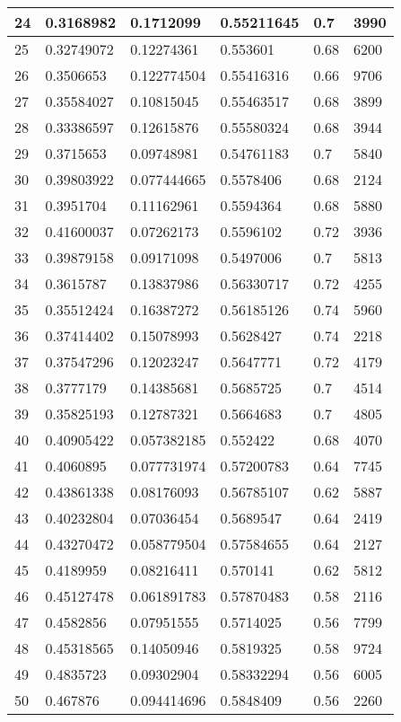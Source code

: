 \begin{longtable}{|l|l|l|l|l|l|}
24 & 0.3168982 & 0.1712099 & 0.55211645 & 0.7 & 3990 \\ \hline 
25 & 0.32749072 & 0.12274361 & 0.553601 & 0.68 & 6200 \\ \hline 
26 & 0.3506653 & 0.122774504 & 0.55416316 & 0.66 & 9706 \\ \hline 
27 & 0.35584027 & 0.10815045 & 0.55463517 & 0.68 & 3899 \\ \hline 
28 & 0.33386597 & 0.12615876 & 0.55580324 & 0.68 & 3944 \\ \hline 
29 & 0.3715653 & 0.09748981 & 0.54761183 & 0.7 & 5840 \\ \hline 
30 & 0.39803922 & 0.077444665 & 0.5578406 & 0.68 & 2124 \\ \hline 
31 & 0.3951704 & 0.11162961 & 0.5594364 & 0.68 & 5880 \\ \hline 
32 & 0.41600037 & 0.07262173 & 0.5596102 & 0.72 & 3936 \\ \hline 
33 & 0.39879158 & 0.09171098 & 0.5497006 & 0.7 & 5813 \\ \hline 
34 & 0.3615787 & 0.13837986 & 0.56330717 & 0.72 & 4255 \\ \hline 
35 & 0.35512424 & 0.16387272 & 0.56185126 & 0.74 & 5960 \\ \hline 
36 & 0.37414402 & 0.15078993 & 0.5628427 & 0.74 & 2218 \\ \hline 
37 & 0.37547296 & 0.12023247 & 0.5647771 & 0.72 & 4179 \\ \hline 
38 & 0.3777179 & 0.14385681 & 0.5685725 & 0.7 & 4514 \\ \hline 
39 & 0.35825193 & 0.12787321 & 0.5664683 & 0.7 & 4805 \\ \hline 
40 & 0.40905422 & 0.057382185 & 0.552422 & 0.68 & 4070 \\ \hline 
41 & 0.4060895 & 0.077731974 & 0.57200783 & 0.64 & 7745 \\ \hline 
42 & 0.43861338 & 0.08176093 & 0.56785107 & 0.62 & 5887 \\ \hline 
43 & 0.40232804 & 0.07036454 & 0.5689547 & 0.64 & 2419 \\ \hline 
44 & 0.43270472 & 0.058779504 & 0.57584655 & 0.64 & 2127 \\ \hline 
45 & 0.4189959 & 0.08216411 & 0.570141 & 0.62 & 5812 \\ \hline 
46 & 0.45127478 & 0.061891783 & 0.57870483 & 0.58 & 2116 \\ \hline 
47 & 0.4582856 & 0.07951555 & 0.5714025 & 0.56 & 7799 \\ \hline 
48 & 0.45318565 & 0.14050946 & 0.5819325 & 0.58 & 9724 \\ \hline 
49 & 0.4835723 & 0.09302904 & 0.58332294 & 0.56 & 6005 \\ \hline 
50 & 0.467876 & 0.094414696 & 0.5848409 & 0.56 & 2260 \\ \hline 
\end{longtable}